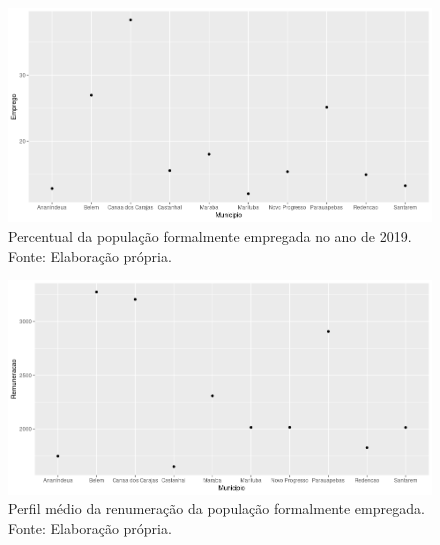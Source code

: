 \documentclass[a4paper, 10pt]{article}
\begin{document}
 \begin{figure}[H]
	\centering 
	\includegraphics[scale=0.45]{EMPREGO.png}
	\caption{\centering Percentual da população formalmente empregada no ano de 2019. \\ Fonte: Elaboração própria.}
	\label{}
	\end{figure}


 \begin{figure}[H]
	\centering 
	\includegraphics[scale=0.45]{REMUNERACAO.png}
	\caption{\centering Perfil médio da renumeração da população formalmente empregada. \\ Fonte: Elaboração própria.}
	\label{}
	\end{figure}
\end{document}
